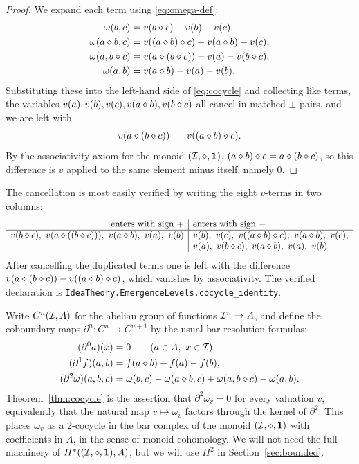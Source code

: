 \begin{proof}
We expand each term using \eqref{eq:omega-def}:
\begin{align*}
  \omega(b,c) &= v(b\mathbin{\diamond} c) - v(b) - v(c),\\
  \omega(a\mathbin{\diamond} b, c) &= v((a\mathbin{\diamond} b)\mathbin{\diamond} c) - v(a\mathbin{\diamond} b) -
  v(c),\\
  \omega(a, b\mathbin{\diamond} c) &= v(a\mathbin{\diamond} (b\mathbin{\diamond} c)) - v(a) - v(b\mathbin{\diamond}
  c),\\
  \omega(a,b) &= v(a\mathbin{\diamond} b) - v(a) - v(b).
\end{align*}
Substituting these into the left-hand side of \eqref{eq:cocycle} and
collecting like terms, the variables $v(a), v(b), v(c), v(a\mathbin{\diamond} b),
v(b\mathbin{\diamond} c)$ all cancel in matched $\pm$ pairs, and we are left with
\[
  v(a\mathbin{\diamond} (b\mathbin{\diamond} c)) \;-\; v((a\mathbin{\diamond} b)\mathbin{\diamond} c).
\]
By the associativity axiom for the monoid $(\mathcal{I},\mathbin{\diamond},\mathbf{1})$, $(a\mathbin{\diamond} b)\mathbin{\diamond} c
= a\mathbin{\diamond} (b\mathbin{\diamond} c)$, so this difference is $v$ applied to the same
element minus itself, namely $0$.
\end{proof}

The cancellation is most easily verified by writing the eight $v$-terms in
two columns:
\[
\begin{array}{r|l}
\text{enters with sign }+ & \text{enters with sign }- \\\hline
v(b\compose c),\ v(a\compose((b\compose c))),\ v(a\compose b),\ v(a),\ v(b)
& v(b),\ v(c),\ v((a\compose b)\compose c),\ v(a\compose b),\ v(c),\\
& v(a),\ v(b\compose c),\ v(a\compose b),\ v(a),\ v(b)
\end{array}
\]
After cancelling the duplicated terms one is left with the difference
$v(a\mathbin{\diamond}(b\mathbin{\diamond} c)) - v((a\mathbin{\diamond} b)\mathbin{\diamond} c)$, which vanishes by
associativity. The verified declaration is
\texttt{IdeaTheory.EmergenceLevels.cocycle\_identity}.

\begin{remark}\label{rem:cocycle}
Write $C^n(\mathcal{I}, A)$ for the abelian group of functions $\mathcal{I}^n \to A$,
and define the coboundary maps $\partial^n : C^n \to C^{n+1}$ by the usual
bar-resolution formulas:
\begin{align*}
  (\partial^0 a)(x) &= 0 \qquad (a\in A,\ x\in\mathcal{I}),\\
  (\partial^1 f)(a,b) &= f(a\mathbin{\diamond} b) - f(a) - f(b),\\
  (\partial^2 \omega)(a,b,c) &= \omega(b,c) - \omega(a\mathbin{\diamond} b, c) +
  \omega(a, b\mathbin{\diamond} c) - \omega(a,b).
\end{align*}
Theorem~\ref{thm:cocycle} is the assertion that $\partial^2 \omega_v = 0$ for
every valuation $v$, equivalently that the natural map $v \mapsto \omega_v$
factors through the kernel of $\partial^2$. This places $\omega_v$ as a
2-cocycle in the bar complex of the monoid $(\mathcal{I},\mathbin{\diamond},\mathbf{1})$ with coefficients in
$A$, in the sense of monoid cohomology. We will not need the full machinery
of $H^*((\mathcal{I},\mathbin{\diamond},\mathbf{1}), A)$, but we will use $H^2$ in Section~\ref{sec:bounded}.
\end{remark}

